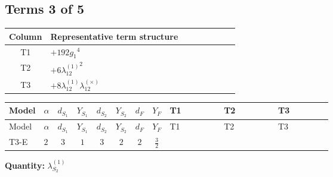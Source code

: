 \documentclass[8pt]{article}
\begin{document}
\begin{landscape}
\subsection*{Terms 3 of 5}
\begin{center}
\begin{tabular}{@{}c >{\raggedright\arraybackslash}p{0.82\linewidth}@{}}
\toprule
Column & Representative term structure \\
\midrule
T1 & \(\displaystyle +192 {g_1}^4\) \\
\midrule
T2 & \(\displaystyle +6 {\lambda_{12}^{(1)}}^2\) \\
\midrule
T3 & \(\displaystyle +8 {\lambda_{12}^{(1)}} {\lambda_{12}^{(\times)}}\) \\
\midrule
\bottomrule
\end{tabular}
\end{center}
\smallskip
\tiny
\begin{longtable}{@{}llcccccc >{\raggedright\arraybackslash}p{0.21\linewidth} >{\raggedright\arraybackslash}p{0.21\linewidth} >{\raggedright\arraybackslash}p{0.21\linewidth}@{}}
\toprule
Model & $\alpha$ & $d_{S_1}$ & $Y_{S_1}$ & $d_{S_2}$ & $Y_{S_2}$ & $d_F$ & $Y_F$ & T1 & T2 & T3 \\
\midrule
\endfirsthead
\toprule
Model & $\alpha$ & $d_{S_1}$ & $Y_{S_1}$ & $d_{S_2}$ & $Y_{S_2}$ & $d_F$ & $Y_F$ & T1 & T2 & T3 \\
\midrule
\endhead
T3-E & $2$ & $3$ & $1$ & $3$ & $2$ & $2$ & $\frac{3}{2}$ & \scriptsize\adjustbox{max width=\linewidth}{$\begin{gathered} +192 {g_1}^4\end{gathered}$} & \scriptsize\adjustbox{max width=\linewidth}{$\begin{gathered} +6 {\lambda_{12}^{(1)}}^2\end{gathered}$} & \scriptsize\adjustbox{max width=\linewidth}{$\begin{gathered} +8 {\lambda_{12}^{(1)}} {\lambda_{12}^{(\times)}}\end{gathered}$} \\
\midrule
\bottomrule
\end{longtable}
\clearpage
\noindent\textbf{Quantity: }$\lambda_{S_2}^{(1)}$\par\smallskip

\end{landscape}
\end{document}
